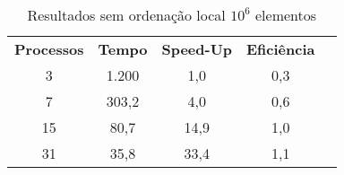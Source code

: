 \begin{table}[h!]
\centering
\caption{Resultados sem ordenação local $10^6$ elementos}
\label{table:parallel-1M}
\begin{tabular}{ccccc}
\textbf{Processos} & \textbf{Tempo} & \textbf{Speed-Up} & \textbf{Eficiência} \\
 3                & 1.200          & 1,0               & 0,3                 \\
 7                & 303,2          & 4,0               & 0,6                 \\
 15               & 80,7           & 14,9              & 1,0                 \\
 31               & 35,8           & 33,4              & 1,1                 \\
\end{tabular}
\end{table}
